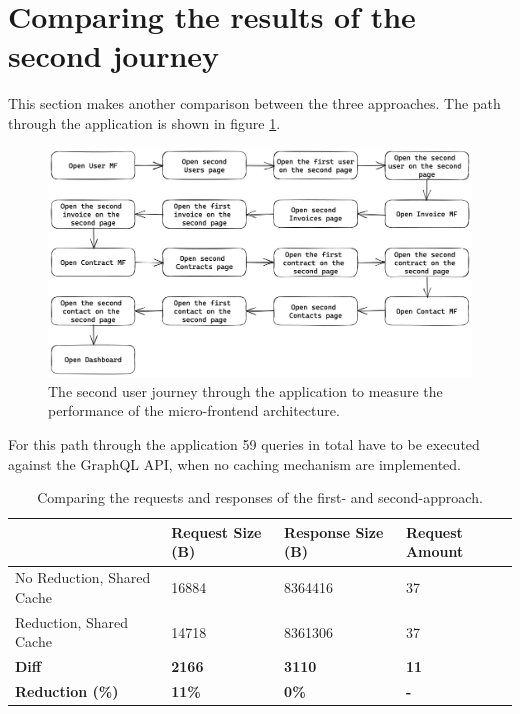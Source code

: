 \section{Comparing the results of the second journey}

This section makes another comparison between the three approaches. The path through the application is shown in figure \ref{fig:results:evaluation-second-path}.


\ifshowImages
\begin{figure}[H]
\centering
\includegraphics[width=1\linewidth]{images/results/evaluation-second-path.png}
\caption{The second user journey through the application to measure the performance of the micro-frontend architecture.}\label{fig:results:evaluation-second-path}
\end{figure}
\fi

\noindent For this path through the application 59 queries in total have to be executed against the
GraphQL \ac{API}, when no caching mechanism are implemented.

\begin{table}[H]
    \begin{tabular}{|l|l|l|l|}
    \hline
                                    & Request Size (B) & Response Size (B) & Request Amount  \\
    \hline
     No Reduction, Shared Cache     &  16884       &  8364416   & 37 \\
     \hline
     Reduction, Shared Cache        &  14718       &  8361306   & 37 \\
     \hline
     \hline
    \textbf{Diff}                   & \textbf{2166} & \textbf{3110} & \textbf{11} \\
    \hline
    \textbf{Reduction (\%)} & \textbf{11\%} & \textbf{0\%} & \textbf{-} \\
     \hline
    \end{tabular}
    \caption{Comparing the requests and responses of the first- and second-approach.}
    \label{table:results:size-comparison-second-path-no-cache-no-reduction-cache-no-reduction}
\end{table}

